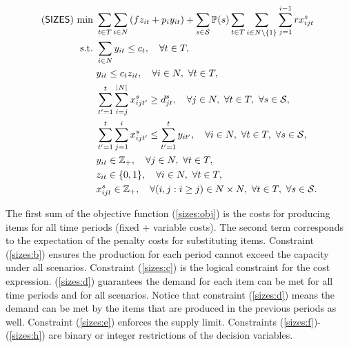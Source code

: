\begin{subequations} \label{sizes:formulation}
	\begin{align}
	(\textsf{SIZES})\ \textrm{min}\ &\sum_{t\in T}\sum_{i\in N} \left(fz_{it} + p_i y_{it} \right) + 
	\sum_{s\in \mathcal{S}} \operatorname*{\mathbb{P}}(s)\sum_{t\in T}\sum_{i\in N\backslash\{1\}}\sum_{j=1}^{i-1}rx_{ijt}^s \label{sizes:obj}\\
	\textrm{s.t.}\ &\sum_{i\in N}y_{it}\le c_{t},\quad \forall t\in T, \label{sizes:b}\\
	&y_{it}\le c_{t} z_{it},\quad\forall i \in N,\ \forall t\in T,\label{sizes:c}\\
	&\sum_{t'=1}^{t}\sum_{i=j}^{|N|} x_{ijt'}^s \ge d_{jt}^s,\quad\forall j\in N,\ \forall t\in T,\  \forall s\in \mathcal{S},\label{sizes:d}\\
	&\sum_{t'=1}^{t}\sum_{j=1}^{i}x_{ijt'}^s\le\sum_{t'=1}^{t}y_{it'}, \quad\forall i\in N,\ \forall t\in T,\ \forall s\in \mathcal{S},\label{sizes:e}\\
	&y_{it}\in\mathbb{Z}_+,\quad \forall j\in N,\ \forall t\in T,\label{sizes:f}\\
	&z_{it}\in\{0,1\},\quad\forall i\in N,\ \forall t\in T,\label{sizes:g}\\
	&x_{ijt}^s\in\mathbb{Z}_+,\quad\forall (i,j:i\ge j)\in N\times N,\ \forall t\in T,\ \forall s\in \mathcal{S}.\label{sizes:h}
	\end{align}
\end{subequations}

The first sum of the objective function (\ref{sizes:obj}) is the costs for producing items for all time periods (fixed + variable costs). The second term corresponds to the expectation of the penalty costs for substituting items. Constraint (\ref{sizes:b}) ensures the production for each period cannot exceed the capacity under all scenarios. Constraint (\ref{sizes:c}) is the logical constraint for the cost expression. (\ref{sizes:d}) guarantees the demand for each item can be met for all time periods and for all scenarios. Notice that constraint (\ref{sizes:d}) means the demand can be met by the items that are produced in the previous periods as well. Constraint (\ref{sizes:e}) enforces the supply limit. Constraints (\ref{sizes:f})-(\ref{sizes:h}) are binary or integer restrictions of the decision variables.

